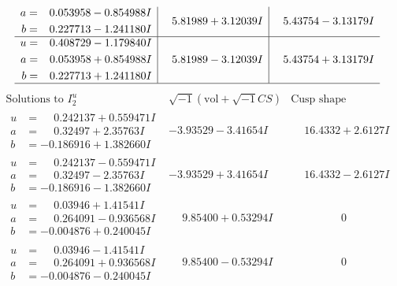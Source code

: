 \documentclass[1p]{elsarticle_modified}
\theoremstyle{definition}
\newcommand{\I}{\sqrt{-1}}
\begin{document}
$$\begin{array}{c|c|c}
\begin{aligned}
a &= \phantom{-}0.053958 - 0.854988 I \\
b &= \phantom{-}0.227713 - 1.241180 I\end{aligned}
 & \phantom{-}5.81989 + 3.12039 I & \phantom{-}5.43754 - 3.13179 I \\ \hline\begin{aligned}
u &= \phantom{-}0.408729 - 1.179840 I \\
a &= \phantom{-}0.053958 + 0.854988 I \\
b &= \phantom{-}0.227713 + 1.241180 I\end{aligned}
 & \phantom{-}5.81989 - 3.12039 I & \phantom{-}5.43754 + 3.13179 I\\
 \hline 
 \end{array}$$\newpage$$\begin{array}{c|c|c}  
\text{Solutions to }I^u_{2}& \I (\text{vol} + \sqrt{-1}CS) & \text{Cusp shape}\\
 \hline 
\begin{aligned}
u &= \phantom{-}0.242137 + 0.559471 I \\
a &= \phantom{-}0.32497 + 2.35763 I \\
b &= -0.186916 + 1.382660 I\end{aligned}
 & -3.93529 - 3.41654 I & \phantom{-}16.4332 + 2.6127 I \\ \hline\begin{aligned}
u &= \phantom{-}0.242137 - 0.559471 I \\
a &= \phantom{-}0.32497 - 2.35763 I \\
b &= -0.186916 - 1.382660 I\end{aligned}
 & -3.93529 + 3.41654 I & \phantom{-}16.4332 - 2.6127 I \\ \hline\begin{aligned}
u &= \phantom{-}0.03946 + 1.41541 I \\
a &= \phantom{-}0.264091 - 0.936568 I \\
b &= -0.004876 + 0.240045 I\end{aligned}
 & \phantom{-}9.85400 + 0.53294 I & \phantom{-0.000000 } 0 \\ \hline\begin{aligned}
u &= \phantom{-}0.03946 - 1.41541 I \\
a &= \phantom{-}0.264091 + 0.936568 I \\
b &= -0.004876 - 0.240045 I\end{aligned}
 & \phantom{-}9.85400 - 0.53294 I & \phantom{-0.000000 } 0 \\ \hline\begin{aligned}

\end{aligned}
\end{array}$$
\end{document}
